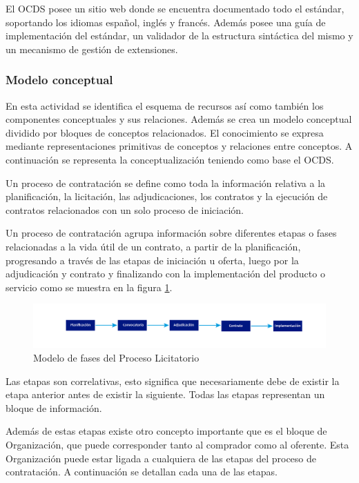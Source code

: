 El OCDS posee un sitio web donde se encuentra documentado todo el estándar, soportando los idiomas español, inglés y francés. Además posee una guía de implementación del estándar, un validador de la estructura sintáctica del mismo y un mecanismo de gestión de extensiones.

\subsubsection{Modelo conceptual}

En esta actividad se identifica el esquema de recursos así como también los componentes conceptuales y sus relaciones. Además se crea un modelo conceptual dividido por bloques de conceptos relacionados. El conocimiento se expresa mediante representaciones primitivas de conceptos y relaciones entre conceptos. A continuación se representa la conceptualización teniendo como base el OCDS.

Un proceso de contratación se define como toda la información relativa a la planificación, la licitación, las adjudicaciones, los contratos y la ejecución de contratos relacionados con un solo proceso de iniciación.

Un proceso de contratación agrupa información sobre diferentes etapas o fases relacionadas a la vida útil de un contrato, a partir de la planificación, progresando a través de las etapas de iniciación u oferta, luego por la adjudicación y contrato y finalizando con la implementación del producto o servicio como se muestra en la figura \ref{img:fases del proceso licitatorio }.

\begin{figure}[!htbp]
    \centering
    \includegraphics[width=150mm]{figuras/Diagramas_ProcesoLicitatorio.png}
    \caption{Modelo de fases del Proceso Licitatorio}
    \label{img:fases del proceso licitatorio }
\end{figure}

Las etapas son correlativas, esto significa que necesariamente debe de existir la etapa anterior antes de existir la siguiente. Todas las etapas representan un bloque de información.

Además de estas etapas existe otro concepto importante que es el bloque de Organización, que puede corresponder tanto al comprador como al oferente. Esta Organización puede estar ligada a cualquiera de las etapas del proceso de contratación. A continuación se detallan cada una de las etapas.
